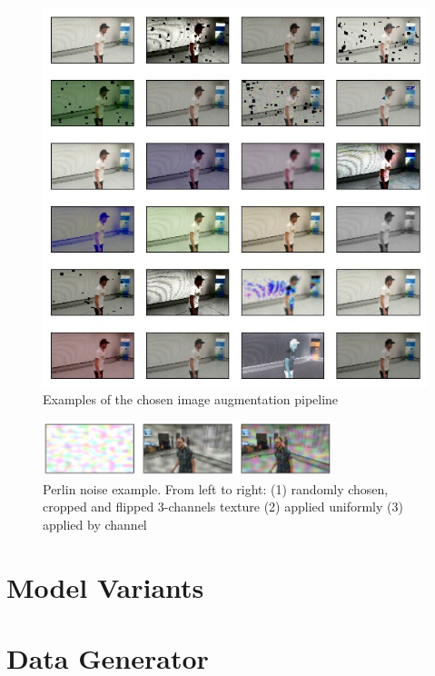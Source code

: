 \begin{figure}[!h]
	\centering
	\includegraphics[width=1 \textwidth]{"contents/images/05-imgaug-chosen"}
	\caption[Examples of the chosen image augmentation pipeline]{Examples of the chosen image augmentation pipeline}
	\label{fig:albumentation-chosen}
\end{figure}

\begin{figure}[!h]
	\centering
	\includegraphics[width=0.75\textwidth]{"contents/images/05-imgaug-pelin"}
	\caption[Perlin noise example]{Perlin noise example. From left to right: (1) randomly chosen, cropped and flipped 3-channels texture (2) applied uniformly (3) applied by channel}
	\label{fig:perlin-noise}
\end{figure}



\section{Model Variants} %
\label{sec:model-variants}

\section{Data Generator}
\label{sec:data-generator}

